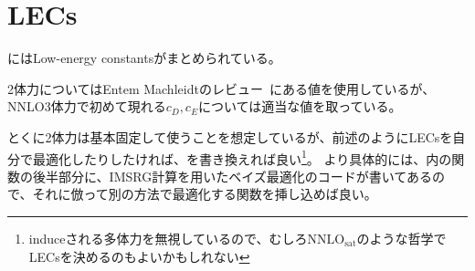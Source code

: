 \documentclass[dvipdfmx,uplatex]{jsarticle}
\begin{document}
\section{LECs}

にはLow-energy constantsがまとめられている。

2体力についてはEntem Machleidtのレビュー~\cite{EMrev}にある値を使用しているが、
NNLO3体力で初めて現れる$c_D,c_E$については適当な値を取っている。

とくに2体力は基本固定して使うことを想定しているが、前述のようにLECsを自分で最適化したりしたければ、を書き換えれば良い\footnote{induceされる多体力を無視しているので、むしろ$\mathrm{NNLO}_\mathrm{sat}$のような哲学でLECsを決めるのもよいかもしれない}。
より具体的には、内の関数の後半部分に、IMSRG計算を用いたベイズ最適化のコードが書いてあるので、それに倣って別の方法で最適化する関数を挿し込めば良い。


\end{document}

